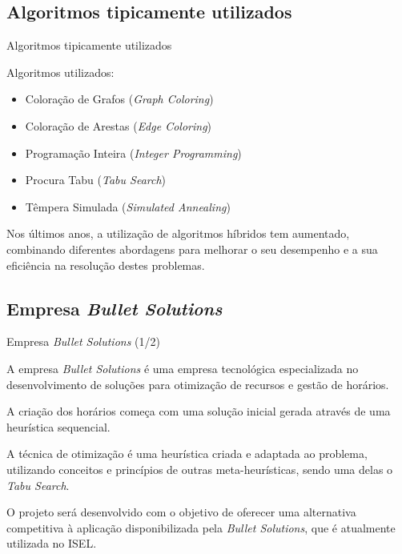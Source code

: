 \documentclass[aspectratio=169]{beamer}
\begin{document}
    \subsection{Algoritmos tipicamente utilizados}

    \begin{frame}{Algoritmos tipicamente utilizados}
        \justifying

        Algoritmos utilizados:
        \begin{itemize}
            \item Coloração de Grafos (\textit{Graph Coloring})
            \item Coloração de Arestas (\textit{Edge Coloring})
            \item Programação Inteira (\textit{Integer Programming})
            \item Procura Tabu (\textit{Tabu Search})
            \item Têmpera Simulada (\textit{Simulated Annealing})
        \end{itemize}

        \vfill

        Nos últimos anos, a utilização de algoritmos híbridos tem aumentado, combinando diferentes abordagens para melhorar o seu desempenho e a sua eficiência na resolução destes problemas.
    \end{frame}

    \subsection{Empresa \textit{Bullet Solutions}}

    \begin{frame}{Empresa \textit{Bullet Solutions} (1/2)}
        \justifying

        A empresa \textit{Bullet Solutions} é uma empresa tecnológica especializada no desenvolvimento de soluções para otimização de recursos e gestão de horários.

        \vfill

        A criação dos horários começa com uma solução inicial gerada através de uma heurística sequencial.

        \vfill

        A técnica de otimização é uma heurística criada e adaptada ao problema, utilizando conceitos e princípios de outras meta-heurísticas, sendo uma delas o \textit{Tabu Search}.

        \vfill

        O projeto será desenvolvido com o objetivo de oferecer uma alternativa competitiva à aplicação disponibilizada pela \textit{Bullet Solutions}, que é atualmente utilizada no ISEL.

        \vfill
    \end{frame}
\end{document}
